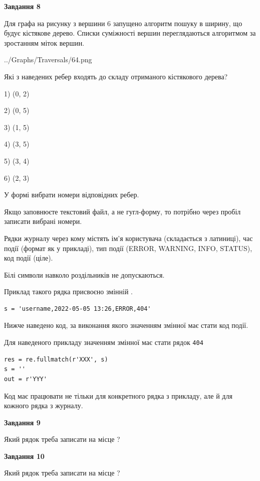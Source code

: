 \documentclass[12pt, ukrainian]{article}
\def\code#1{\Verb!#1!}
\begin{document}
{\begin {large}
{\begin {center}\textbf{Завдання 8}\end {center}}\par
Для графа на рисунку з вершини 6 запущено алгоритм пошуку в ширину, що будує кістякове дерево. Списки суміжності вершин переглядаються алгоритмом за зростанням міток вершин.\par
\begin{center}
	{../Graphs/Traversals/64.png}
\end{center}
\par Які з наведених ребер входять до складу отриманого кістякового дерева?\par
1) (0, 2)\par
2) (0, 5)\par
3) (1, 5)\par
4) (3, 5)\par
5) (3, 4)\par
6) (2, 3)\par
{\vskip 15pt} У формі вибрати номери відповідних ребер.


Якщо заповнюєте текстовий файл, а не гугл-форму, то потрібно через пробіл записа\-ти вибрані номери.\par
\newpage


Рядки журналу через кому містять ім'я користувача (складається з латиниці), час події (фор\-мат як у прикладі), тип події (ERROR, WARNING, INFO, STATUS), код події (ціле).

Білі символи навколо роздільників не допускаються.

Приклад такого рядка присвоєно змінній .



\begin{verbatim}
s = 'username,2022-05-05 13:26,ERROR,404'
\end{verbatim}


Нижче наведено код, за виконання якого значенням змінної  має стати код події.

Для наведеного прикладу значенням змінної  має стати рядок \code{404}



\begin{verbatim}
res = re.fullmatch(r'XXX', s)
s = ''
out = r'YYY'
\end{verbatim}


Код має працювати не тільки для конкретного рядка з прикладу, але й для кожного рядка з журналу.

{\begin {center}\textbf{Завдання 9}\end {center}}\par
Який рядок треба записати на місце  ?\par
\vspace{5mm}


{\begin {center}\textbf{Завдання 10}\end {center}}\par
Який рядок треба записати на місце  ?\par


\newpage


\end {large}}
\end{document}
